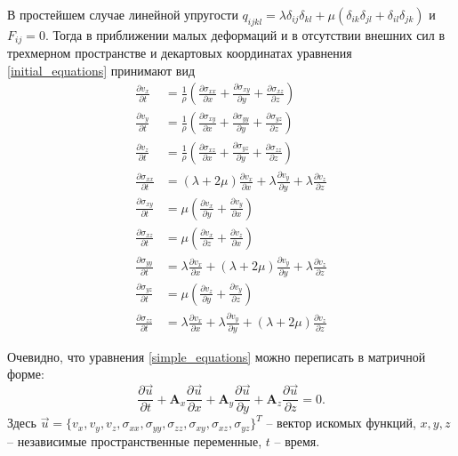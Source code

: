 В простейшем случае линейной упругости $q_{ijkl}=\lambda\delta_{ij}\delta_{kl}+\mu(\delta_{ik}\delta_{jl}+\delta_{il}\delta_{jk})$ и $F_{ij}=0$. Тогда в приближении малых деформаций и в отсутствии внешних сил в трехмерном пространстве и декартовых координатах уравнения \ref{initial_equations} принимают вид
\begin{align}
\label{simple_equations}
\frac{\partial{v_x}}{\partial{t}}&=\frac{1}{\rho}(\frac{\partial{\sigma_{xx}}}{\partial{x}}+\frac{\partial{\sigma_{xy}}}{\partial{y}}+\frac{\partial{\sigma_{xz}}}{\partial{z}})
\nonumber\\
\frac{\partial{v_y}}{\partial{t}}&=\frac{1}{\rho}(\frac{\partial{\sigma_{xy}}}{\partial{x}}+\frac{\partial{\sigma_{yy}}}{\partial{y}}+\frac{\partial{\sigma_{yz}}}{\partial{z}})
\nonumber\\
\frac{\partial{v_z}}{\partial{t}}&=\frac{1}{\rho}(\frac{\partial{\sigma_{xz}}}{\partial{x}}+\frac{\partial{\sigma_{yz}}}{\partial{y}}+\frac{\partial{\sigma_{zz}}}{\partial{z}})
\nonumber\\
\frac{\partial{\sigma_{xx}}}{\partial{t}}&=(\lambda+2\mu)\frac{\partial{v_x}}{\partial{x}}+\lambda\frac{\partial{v_y}}{\partial{y}}+\lambda\frac{\partial{v_z}}{\partial{z}}
\nonumber\\
\frac{\partial{\sigma_{xy}}}{\partial{t}}&=\mu(\frac{\partial{v_x}}{\partial{y}}+\frac{\partial{v_y}}{\partial{x}})
\nonumber\\
\frac{\partial{\sigma_{xz}}}{\partial{t}}&=\mu(\frac{\partial{v_x}}{\partial{z}}+\frac{\partial{v_z}}{\partial{x}})
\nonumber\\
\frac{\partial{\sigma_{yy}}}{\partial{t}}&=\lambda\frac{\partial{v_x}}{\partial{x}}+(\lambda+2\mu)\frac{\partial{v_y}}{\partial{y}}+\lambda\frac{\partial{v_z}}{\partial{z}}
\nonumber\\
\frac{\partial{\sigma_{yz}}}{\partial{t}}&=\mu(\frac{\partial{v_z}}{\partial{y}}+\frac{\partial{v_y}}{\partial{z}})
\nonumber\\
\frac{\partial{\sigma_{zz}}}{\partial{t}}&=\lambda\frac{\partial{v_x}}{\partial{x}}+\lambda\frac{\partial{v_y}}{\partial{y}}+(\lambda+2\mu)\frac{\partial{v_z}}{\partial{z}}
\end{align}

Очевидно, что уравнения \ref{simple_equations} можно переписать в матричной форме:
\begin{equation}
\label{simple_matrix_equation}
\frac{\partial\vec{u}}{\partial{t}}+\mathbf{A}_x\frac{\partial\vec{u}}{\partial{x}}+
\mathbf{A}_y\frac{\partial\vec{u}}{\partial{y}}+
\mathbf{A}_z\frac{\partial\vec{u}}{\partial{z}}=0.
\end{equation}
Здесь
$\vec{u}=\{v_x,v_y,v_z,\sigma_{xx},\sigma_{yy},\sigma_{zz},\sigma_{xy},\sigma_{xz},\sigma_{yz}\}^T$
-- вектор искомых функций, $x,y,z$ --  независимые пространственные переменные, $t$ -- время.

